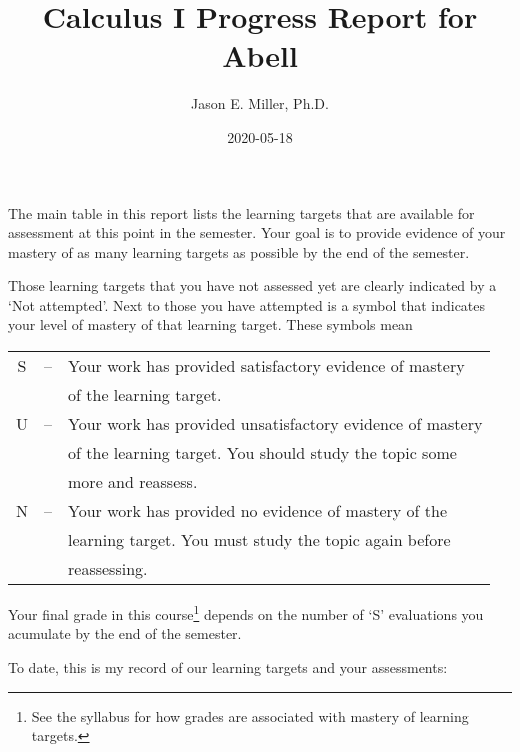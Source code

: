 \documentclass[]{tufte-handout}
\title{Calculus I Progress Report for Abell}
\author{Jason E. Miller, Ph.D.}
\date{2020-05-18}
\begin{document}
\maketitle




The main table in this report lists the learning targets that are
available for assessment at this point in the semester. Your goal is to
provide evidence of your mastery of as many learning targets as possible
by the end of the semester.

Those learning targets that you have not assessed yet are clearly
indicated by a `Not attempted'. Next to those you have attempted is a
symbol that indicates your level of mastery of that learning target.
These symbols mean

\begin{tabular}{ccl}
S & -- & Your work has provided satisfactory evidence of mastery \\
&& of the learning target.  \\
U & -- & Your work has provided unsatisfactory evidence of mastery \\
&& of the learning target.  You should study the topic some \\
&&more and reassess.  \\
N & -- & Your work has provided no evidence of mastery of the \\
&&learning target.  You must study the topic again before \\
&&reassessing.  \\
\end{tabular}

\medskip

Your final grade in this
course\footnote{See the syllabus for how grades are associated with mastery of learning targets.}
depends on the number of `S' evaluations you acumulate by the end of the
semester.

\bigskip

\noindent To date, this is my record of our learning targets and your
assessments:
\end{document}
